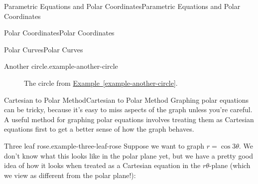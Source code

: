 \documentclass[10pt,]{book}
\numberwithin{equation}{section}
\begin{document}
\begin{chapterptx}{Parametric Equations and Polar Coordinates}{}{Parametric Equations and Polar Coordinates}{}{}
\begin{sectionptx}{Polar Coordinates}{}{Polar Coordinates}{}{}
\begin{subsectionptx}{Polar Curves}{}{Polar Curves}{}{}
\begin{example}{Another circle.}{example-another-circle}
\end{example}
\begin{figure}
\centering
{
}
\caption{The circle from \hyperref[example-another-circle]{Example~\ref{example-another-circle}}.\label{figure-cosine-polar-circle}}
\end{figure}
\end{subsectionptx}
%
%
\typeout{************************************************}
\typeout{************************************************}
%
\begin{subsectionptx}{Cartesian to Polar Method}{}{Cartesian to Polar Method}{}{}\label{subsection-cartesian-to-polar-method}
\hypertarget{p-815}{}%
Graphing polar equations can be tricky, because it's easy to miss aspects of the graph unless you're careful. A useful method for graphing polar equations involves treating them as Cartesian equations first to get a better sense of how the graph behaves.%
\begin{example}{Three leaf rose.}{example-three-leaf-rose}%
\hypertarget{p-816}{}%
Suppose we want to graph \(r = \cos3\theta\). We don't know what this looks like in the polar plane yet, but we have a pretty good idea of how it looks when treated as a Cartesian equation in the \(r\theta\)-plane (which we view as different from the polar plane!):%
\begin{figure}
\centering
{
}
\end{figure}
\end{example}
\end{subsectionptx}
\end{sectionptx}
\end{chapterptx}
\end{document}
